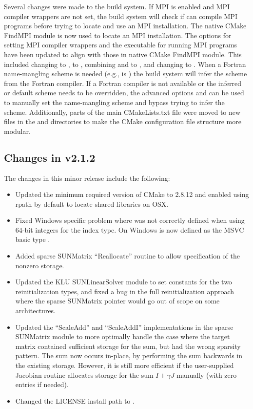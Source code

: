 Several changes were made to the build system. If MPI is enabled and
MPI compiler wrappers are not set, the build system will check if
 can compile MPI programs before
trying to locate and use an MPI installation. The native CMake FindMPI
module is now used to locate an MPI installation. The options for
setting MPI compiler wrappers and the executable for running MPI
programs have been updated to align with those in native CMake FindMPI
module. This included changing  to
,  to ,
combining  and  to
, and changing  to
. When a Fortran name-mangling scheme is needed (e.g.,
 is ) the build system will infer the scheme
from the Fortran compiler. If a Fortran compiler is not available or
the inferred or default scheme needs to be overridden, the advanced
options  and
 can be used to manually set the
name-mangling scheme and bypass trying to infer the
scheme. Additionally, parts of the main CMakeLists.txt file were moved
to new files in the  and  directories to make the
CMake configuration file structure more modular.

\subsection*{Changes in v2.1.2}

The changes in this minor release include the following:
\begin{itemize}
\item Updated the minimum required version of CMake to 2.8.12 and enabled
  using rpath by default to locate shared libraries on OSX.
\item Fixed Windows specific problem where  was not correctly 
  defined when using 64-bit integers for the {\sundials} index type. On Windows
   is now defined as the MSVC basic type .
\item Added sparse SUNMatrix ``Reallocate'' routine to allow specification of
  the nonzero storage.
\item Updated the KLU SUNLinearSolver module to set constants for the two
  reinitialization types, and fixed a bug in the full reinitialization
  approach where the sparse SUNMatrix pointer would go out of scope on
  some architectures.
\item Updated the ``ScaleAdd'' and ``ScaleAddI'' implementations in the
  sparse SUNMatrix module to more optimally handle the case where the
  target matrix contained sufficient storage for the sum, but had the
  wrong sparsity pattern.  The sum now occurs in-place, by performing
  the sum backwards in the existing storage.  However, it is still more
  efficient if the user-supplied Jacobian routine allocates storage for
  the sum $I+\gamma J$ manually (with zero entries if needed).
\item Changed the LICENSE install path to .
\end{itemize}

